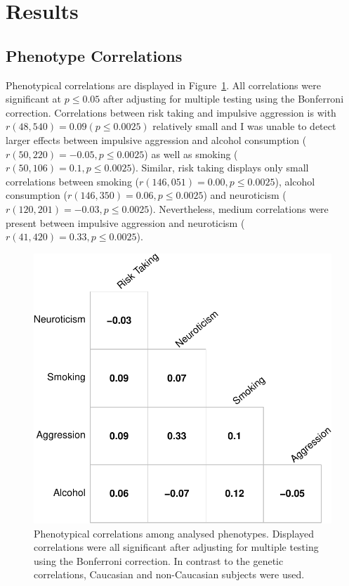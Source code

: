 \section{Results}
\label{sec:results_ukb_assoc}

\subsection{Phenotype Correlations}
\label{sub:phenotype_correlations}

Phenotypical correlations are displayed in Figure~\ref{fig:corr_pheno}. 
All correlations were significant at $p\leq 0.05$ after adjusting for multiple testing using the Bonferroni correction.
Correlations between risk taking and impulsive aggression is with $r(48,540)=0.09 (p\leq0.0025)$ relatively small
and I was unable to detect larger effects between impulsive aggression and alcohol consumption ($r(50,220)=-0.05, p\leq0.0025$)
as well as smoking ($r(50,106)=0.1, p\leq0.0025$).
Similar, risk taking displays only small correlations between
smoking ($r(146,051)=0.00, p\leq0.0025$),
alcohol consumption ($r(146,350)=0.06, p\leq0.0025$)
and neuroticism ($r(120,201)=-0.03, p\leq0.0025$). 
Nevertheless, medium correlations were present between impulsive aggression and neuroticism ($r(41,420)=0.33, p\leq0.0025$).

\begin{figure}[htpb]
  \centering
  \includegraphics[width=0.6\linewidth]{figure/phenotype/corr_plot_ci.pdf} 
  \caption{
    Phenotypical correlations among analysed phenotypes.
    Displayed correlations were all significant after adjusting for multiple testing using the Bonferroni correction.
    In contrast to the genetic correlations, Caucasian and non-Caucasian subjects were used.
  }\label{fig:corr_pheno}
\end{figure}

